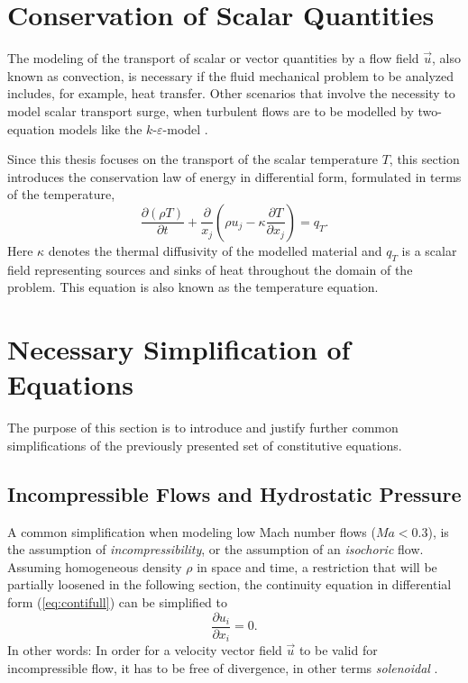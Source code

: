 \section{Conservation of Scalar Quantities}

The modeling of the transport of scalar or vector quantities by a flow field \(\vec{u}\), also known as convection, is necessary if the fluid mechanical problem to be analyzed includes, for example, heat transfer. Other scenarios that involve the necessity to model scalar transport surge, when turbulent flows are to be modelled by two-equation models like the \(k\)-\(\varepsilon\)-model \cite{pope00}. 
    
Since this thesis focuses on the transport of the scalar temperature \(T\), this section introduces the conservation law of energy in differential form, formulated in terms of the temperature,
\begin{displaymath}
  \frac{\partial \left(\rho T \right)}{\partial t} + \frac{\partial}{x_j} \left( \rho u_j - \kappa \frac{\partial T}{\partial x_j} \right) = q_T.
\end{displaymath}
Here \(\kappa\) denotes the thermal diffusivity of the modelled material and \(q_T\) is a scalar field representing sources and sinks of heat throughout the domain of the problem. This equation is also known as the temperature equation.

\section{Necessary Simplification of Equations}

The purpose of this section is to introduce and justify further common simplifications of the previously presented set of constitutive equations. 

\subsection{Incompressible Flows and Hydrostatic Pressure}

A common simplification when modeling low Mach number flows (\(Ma < 0.3\)), is the assumption of \emph{incompressibility}, or the assumption of an \emph{isochoric} flow. Assuming homogeneous density \(\rho\) in space and time, a restriction that will be partially loosened in the following section, the continuity equation in differential form (\ref{eq:contifull}) can be simplified to
\begin{displaymath}
  \frac{\partial u_i}{\partial x_i} = 0.
\end{displaymath}
In other words: In order for a velocity vector field \(\vec{u}\) to be valid for incompressible flow, it has to be free of divergence, in other terms \emph{solenoidal} \cite{spurk10,aris62}.

